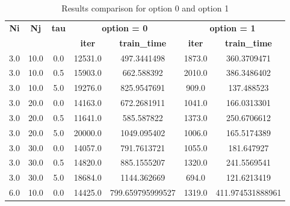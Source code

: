 
\begin{table}[ht]
\centering
\begin{tabular}{|c|c|c|c|c|c|c|}
\hline
\textbf{Ni} & \textbf{Nj} & \textbf{tau} & \multicolumn{2}{c|}{\textbf{option = 0}} & \multicolumn{2}{c|}{\textbf{option = 1}} \\
\cline{4-7}
 &  &  & \textbf{iter} & \textbf{train\_time} & \textbf{iter} & \textbf{train\_time} \\
\hline
3.0 & 10.0 & 0.0 & 12531.0 & 497.3441498 & 1873.0 & 360.3709471 \\ 
\hline
3.0 & 10.0 & 0.5 & 15903.0 & 662.588392 & 2010.0 & 386.3486402 \\ 
\hline
3.0 & 10.0 & 5.0 & 19276.0 & 825.9547691 & 909.0 & 137.488523 \\ 
\hline
3.0 & 20.0 & 0.0 & 14163.0 & 672.2681911 & 1041.0 & 166.0313301 \\ 
\hline
3.0 & 20.0 & 0.5 & 11641.0 & 585.587822 & 1373.0 & 250.6706612 \\ 
\hline
3.0 & 20.0 & 5.0 & 20000.0 & 1049.095402 & 1006.0 & 165.5174389 \\ 
\hline
3.0 & 30.0 & 0.0 & 14057.0 & 791.7613721 & 1055.0 & 181.647927 \\ 
\hline
3.0 & 30.0 & 0.5 & 14820.0 & 885.1555207 & 1320.0 & 241.5569541 \\ 
\hline
3.0 & 30.0 & 5.0 & 18684.0 & 1144.362669 & 694.0 & 121.6213419 \\ 
\hline
6.0 & 10.0 & 0.0 & 14425.0 & 799.659795999527 & 1319.0 & 411.974531888961 \\ 
\hline

\end{tabular}
\caption{Results comparison for option 0 and option 1}
\label{tab:results_comparison}
\end{table}
